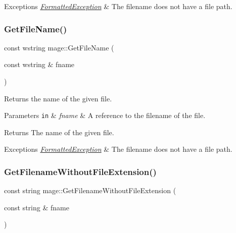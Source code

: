\begin{DoxyExceptions}{Exceptions}
{\em \hyperlink{structmage_1_1_formatted_exception}{Formatted\+Exception}} & The filename does not have a file path. \\
\hline
\end{DoxyExceptions}
\hypertarget{namespacemage_ac643523ad89ca58419a2cac93912693b}{}\label{namespacemage_ac643523ad89ca58419a2cac93912693b} 
\subsubsection{\texorpdfstring{Get\+File\+Name()}{GetFileName()}\hspace{0.1cm}{\footnotesize\ttfamily [2/2]}}
{\footnotesize\ttfamily const wstring mage\+::\+Get\+File\+Name (\begin{DoxyParamCaption}\item[{const wstring \&}]{fname }\end{DoxyParamCaption})}

Returns the name of the given file.


\begin{DoxyParams}[1]{Parameters}
\mbox{\tt in}  & {\em fname} & A reference to the filename of the file. \\
\hline
\end{DoxyParams}
\begin{DoxyReturn}{Returns}
The name of the given file. 
\end{DoxyReturn}

\begin{DoxyExceptions}{Exceptions}
{\em \hyperlink{structmage_1_1_formatted_exception}{Formatted\+Exception}} & The filename does not have a file path. \\
\hline
\end{DoxyExceptions}
\hypertarget{namespacemage_ab8841cbab507ef81edb00278110553ad}{}\label{namespacemage_ab8841cbab507ef81edb00278110553ad} 
\subsubsection{\texorpdfstring{Get\+Filename\+Without\+File\+Extension()}{GetFilenameWithoutFileExtension()}\hspace{0.1cm}{\footnotesize\ttfamily [1/2]}}
{\footnotesize\ttfamily const string mage\+::\+Get\+Filename\+Without\+File\+Extension (\begin{DoxyParamCaption}\item[{const string \&}]{fname }\end{DoxyParamCaption})}

